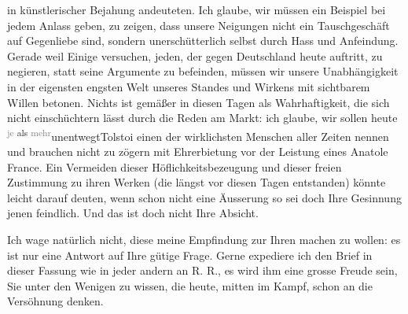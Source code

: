                in künstlerischer Bejahung andeuteten. Ich glaube, wir müssen ein Beispiel bei jedem
               Anlass geben, zu zeigen, dass unsere Neigungen nicht ein Tauschgeschäft auf
               Gegenliebe sind, sondern unerschütterlich selbst durch Hass und Anfeindung. Gerade
               weil Einige versuchen, jeden, der gegen Deutschland heute auftritt, zu negieren,
               statt seine Argumente zu befeinden, müssen wir unsere Unabhängigkeit in der eigensten
               engsten Welt unseres Standes und Wirkens {\pb}mit sichtbarem Willen betonen. Nichts ist gemäßer in diesen Tagen als
               Wahrhaftigkeit, die sich nicht einschüchtern lässt durch die Reden am Markt: ich
               glaube, wir sollen heute \substVorne{}\textsuperscript{\textcolor{gray}{je} als \textcolor{gray}{mehr}}\substDazwischen{}unentwegt\substHinten{}{ }Tolstoi einen der wirklichsten Menschen aller
               Zeiten nennen und brauchen nicht zu zögern mit Ehrerbietung vor der Leistung eines
                  Anatole France. Ein Vermeiden dieser
               Höflichkeitsbezeugung und dieser freien Zustimmung zu ihren Werken (die längst vor
               diesen Tagen entstanden) könnte leicht darauf deuten, wenn schon nicht eine Äusserung
               so sei doch Ihre Gesinnung jenen feindlich. Und das ist doch nicht Ihre Absicht.\pend
           
\pstart
           Ich wage natürlich nicht, diese meine Empfindung zur Ihren machen zu wollen: es ist
               nur eine Antwort auf Ihre gütige Frage. Gerne expediere ich den {\pb}Brief in dieser Fassung wie in
               jeder andern an R. R., es wird ihm eine grosse
               Freude sein, Sie unter den Wenigen zu wissen, die heute, mitten im Kampf, schon an
               die Versöhnung denken.\pend
           
